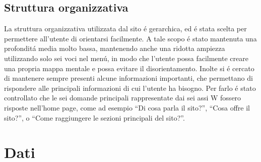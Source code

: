 \documentclass[10pt,a4paper,onecolumn]{article}
\begin{document}
\subsection{Struttura organizzativa}

La struttura organizzativa utilizzata dal sito \'e gerarchica, ed \'e stata scelta per permettere all'utente di orientarsi facilmente. A tale scopo \'e stato mantenuta una profondit\'a media molto bassa, mantenendo anche una ridotta ampiezza utilizzando solo sei voci nel men\'u, in modo che l'utente possa facilmente creare una propria mappa mentale e possa evitare il disorientamento.
Inolte si \'e cercato di mantenere sempre presenti alcune informazioni importanti, che permettano di rispondere alle principali informazioni di cui l'utente ha bisogno. Per farlo \'e stato controllato che le sei domande principali rappresentate dai sei assi W fossero risposte nell'home page, come ad esempio ``Di cosa parla il sito?'', ``Cosa offre il sito?'', o ``Come raggiungere le sezioni principali del sito?''.

\section{Dati}
\end{document}
